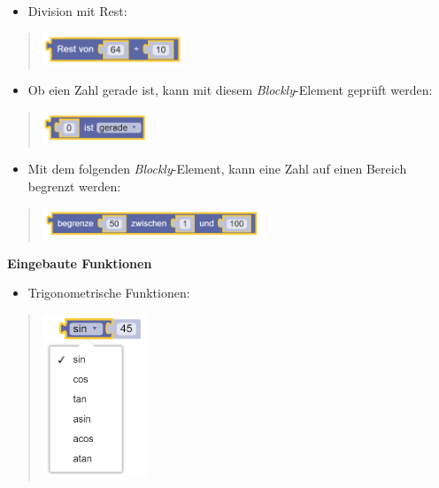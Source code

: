 \documentclass[
  letterpaper,
  DIV=11]{scrreprt}
\providecommand{\tightlist}{%
  \setlength{\itemsep}{0pt}\setlength{\parskip}{0pt}}\usepackage{longtable,booktabs,array}
\begin{document}
\begin{tcolorbox}
\begin{itemize}
\tightlist
\item
  Division mit Rest:
\end{itemize}

\begin{quote}
\includegraphics[width=1.66667in,height=\textheight]{img/screenshot-blockly-math-function-division-with-remaining-01-DEU.png}
\end{quote}

\begin{itemize}
\tightlist
\item
  Ob eien Zahl gerade ist, kann mit diesem \emph{Blockly}-Element
  geprüft werden:
\end{itemize}

\begin{quote}
\includegraphics[width=1.25in,height=\textheight]{img/screenshot-blockly-math-function-is-even-01-DEU.png}
\end{quote}

\begin{itemize}
\tightlist
\item
  Mit dem folgenden \emph{Blockly}-Element, kann eine Zahl auf einen
  Bereich begrenzt werden:
\end{itemize}

\begin{quote}
\includegraphics[width=2.60417in,height=\textheight]{img/screenshot-blockly-math-function-force-into-range-01-DEU.png}
\end{quote}

\textbf{Eingebaute Funktionen}

\begin{itemize}
\tightlist
\item
  Trigonometrische Funktionen:
\end{itemize}

\begin{quote}
\includegraphics[width=1.25in,height=\textheight]{img/screenshot-blockly-math-function-trigenomic-01.png}
\end{quote}


\end{tcolorbox}
\end{document}
